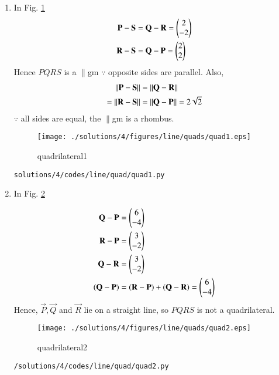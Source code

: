 \begin{enumerate}
\setcounter{figure}{0}
\renewcommand{\thefigure}{\theenumi.\arabic{figure}}

\item In Fig. 	\ref{fig:3.5.4_quadrilateral1}
\begin{align}
 \mathbf{P} - \mathbf{S} &= 
 \mathbf{Q} - \mathbf{R} = \begin{pmatrix}2\\-2\end{pmatrix}
\\
\mathbf {R} - \mathbf {S} &=
 \mathbf {Q} - \mathbf {P} = \begin{pmatrix}2\\2\end{pmatrix}
\end{align}
%
Hence $PQRS$ is a $\parallel$gm $\because$  opposite sides are parallel. Also, 
\begin{align}
\left\lVert \mathbf{P} - \mathbf{S}\right\rVert &= 
\left\lVert \mathbf{Q} - \mathbf{R}\right\rVert 
\\
=\left\lVert\mathbf {R} - \mathbf {S}\right\rVert &=
\left\lVert \mathbf {Q} - \mathbf {P}\right\rVert = 2\sqrt{2}
\end{align}
%
$\because$ all sides are equal, the $\parallel$gm is a rhombus.

\begin{figure}[!ht]
	\centering
	\texttt{[image: ./solutions/4/figures/line/quads/quad1.eps]}
	\caption{quadrilateral1 }
	\label{fig:3.5.4_quadrilateral1}
\end{figure}
\begin{lstlisting}
solutions/4/codes/line/quad/quad1.py
\end{lstlisting}

\item In Fig. 	\ref{fig:3.5.4_quadrilateral2}

\begin{align}
\mathbf{Q} - \mathbf{P} &= \begin{pmatrix}6\\-4\end{pmatrix}
\\
\mathbf{R} - \mathbf{P} &= \begin{pmatrix}3\\-2\end{pmatrix}
\\
\mathbf{Q} - \mathbf{R} &= \begin{pmatrix}3\\-2\end{pmatrix}
\\
\left(\mathbf{Q} - \mathbf{P}\right) &= \left(\mathbf{R} - \mathbf{P}\right) + \left(\mathbf{Q} - \mathbf{R}\right) = \begin{pmatrix}6\\-4\end{pmatrix}
\end{align}
Hence,  $\vec P,\vec Q$ and $\vec R$ lie on a straight line, so $PQRS$ is not  a quadrilateral.

\begin{figure}[!ht]
	\centering
	\texttt{[image: ./solutions/4/figures/line/quads/quad2.eps]}
	\caption{quadrilateral2 }
	\label{fig:3.5.4_quadrilateral2}
\end{figure}
\begin{lstlisting}
/solutions/4/codes/line/quad/quad2.py
\end{lstlisting}


\end{enumerate}
